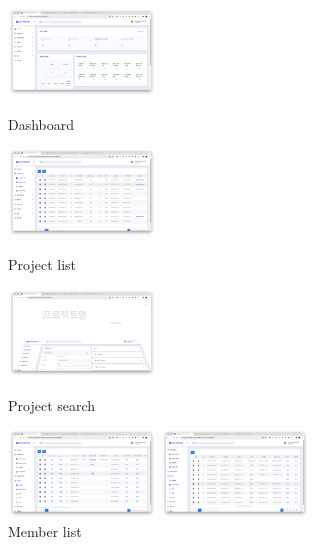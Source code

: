 \begin{itemize}[label=]
\begin{itemize}[label=]
\begin{itemize}
		            \end{itemize}
		            \begin{figure}[!ht]
			            \begin{fullwidth}
				            \parbox{0.35\textwidth}{
					            \centering
					            \includegraphics[width=0.35\textwidth]{images/builderhub-admin-dashboard.png}
					            \caption*{Dashboard}
				            }\qquad
				            \parbox{0.35\textwidth}{
					            \centering
					            \includegraphics[width=0.35\textwidth]{images/builderhub-admin-project-list.png}
					            \caption*{Project list}
				            }\qquad
				            \parbox{0.35\textwidth}{
					            \centering
					            \includegraphics[width=0.35\textwidth]{images/builderhub-admin-project-search.png}
					            \caption*{Project search}
				            }\qquad
				            \parbox{0.35\textwidth}{
					            \centering
					            \includegraphics[width=0.35\textwidth]{images/builderhub-admin-member-list.png}
					            \caption*{Member list}
				            }
				            \parbox{0.35\textwidth}{
					            \centering
					            \includegraphics[width=0.35\textwidth]{images/builderhub-admin-member-identity.png}
}
\end{fullwidth}
\end{figure}
\end{itemize}
\end{itemize}
